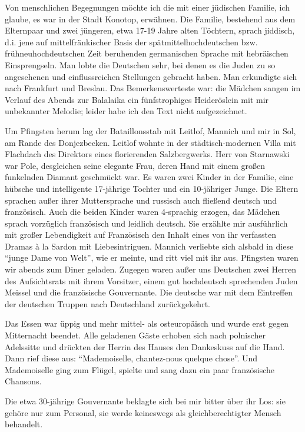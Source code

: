 \documentclass[a5paper,pagesize,10pt,twoside=true]{scrbook}
\begin{document}
Von menschlichen Begegnungen möchte ich die mit einer jüdischen Familie, ich glaube, es war in der Stadt Konotop, erwähnen. Die Familie, bestehend aus dem Elternpaar und zwei jüngeren, etwa 17-19 Jahre alten Töchtern, sprach jiddisch, d.i. jene auf mittelfränkischer Basis der spätmittelhochdeutschen bzw. frühneuhochdeutschen Zeit beruhenden germanischen Sprache mit hebräischen Einsprengseln. Man lobte die Deutschen sehr, bei denen es die Juden zu so angesehenen und einflussreichen Stellungen gebracht haben. Man erkundigte sich nach Frankfurt und Breslau. Das Bemerkenswerteste war: die Mädchen sangen im Verlauf des Abends zur Balalaika ein fünfstrophiges Heideröslein mit mir unbekannter Melodie; leider habe ich den Text nicht aufgezeichnet.

Um Pfingsten herum lag der Bataillonsstab mit Leitlof, Mannich und mir in Sol, am Rande des Donjezbecken. Leitlof wohnte in der städtisch-modernen Villa mit Flachdach des Direktors eines florierenden Salzbergwerks. Herr von Starnawski war Pole, desgleichen seine elegante Frau, deren Hand mit einem großen funkelnden Diamant geschmückt war. Es waren zwei Kinder in der Familie, eine hübsche und intelligente 17-jährige Tochter und ein 10-jähriger Junge. Die Eltern sprachen außer ihrer Muttersprache und russisch auch fließend deutsch und französisch. Auch die beiden Kinder waren 4-sprachig erzogen, das Mädchen sprach vorzüglich französisch und leidlich deutsch. Sie erzählte mir ausführlich mit großer Lebendigkeit auf Französisch den Inhalt eines von ihr verfassten Dramas à la Sardon mit Liebesintriguen. Mannich verliebte sich alsbald in diese \enquote{junge Dame von Welt}, wie er meinte, und ritt viel mit ihr aus. Pfingsten waren wir abends zum Diner geladen. Zugegen waren außer uns Deutschen zwei Herren des Aufsichtsrats mit ihrem Vorsitzer, einem gut hochdeutsch sprechenden Juden Meissel und die französische Gouvernante. Die deutsche war mit dem Eintreffen der deutschen Truppen nach Deutschland zurückgekehrt.

Das Essen war üppig und mehr mittel- als osteuropäisch und wurde erst gegen Mitternacht beendet. Alle geladenen Gäste erhoben sich nach polnischer Adelssitte und drückten der Herrin des Hauses den Dankeskuss auf die Hand. Dann rief diese aus: \enquote{Mademoiselle, chantez-nous quelque chose}. Und Mademoiselle ging zum Flügel, spielte und sang dazu ein paar französische Chansons.

Die etwa 30-jährige Gouvernante beklagte sich bei mir bitter über ihr Los: sie gehöre nur zum Personal, sie werde keineswegs als gleichberechtigter Mensch behandelt.
\end{document}
